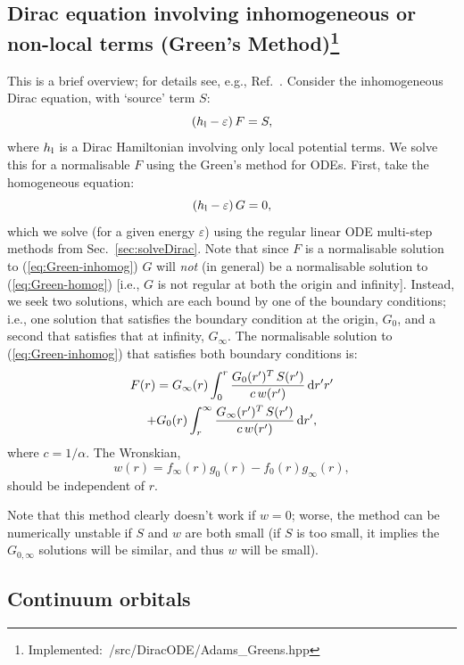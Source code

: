 \documentclass[10pt,twocolumn,a4paper]{article}%
\newcommand{\be}{\begin{equation}}
\newcommand{\ee}{\end{equation}}
\def\d{\ensuremath{{\rm d}}}
\def\en{\ensuremath{\varepsilon}}
\begin{document}
\subsection[Dirac equation involving inhomogeneous terms]{Dirac equation involving inhomogeneous or non-local terms (Green's Method)\footnote{Implemented:~/src/DiracODE/Adams\_Greens.hpp}}


This is a brief overview; for details see, e.g., Ref.~\cite{Arfken2013}.
Consider the inhomogeneous Dirac equation, with `source' term $S$:
\be\label{eq:Green-inhomog}
\left( h_{\rm l}- \en\right)F = S,
\ee
where $h_{\rm l}$ is a Dirac Hamiltonian involving only local potential terms.
We solve this for a normalisable $F$ using the Green's method for ODEs.
First, take the homogeneous equation:
\be\label{eq:Green-homog}
\left(h_{\rm l}- \en\right) G = 0,
\ee
which we solve (for a given energy $\en$) using the regular linear ODE multi-step methods from Sec.~\ref{sec:solveDirac}.
Note that since $F$ is a normalisable solution to (\ref{eq:Green-inhomog}) $G$ will {\em not} (in general) be a normalisable solution to (\ref{eq:Green-homog}) [i.e., $G$ is not regular at both the origin and infinity].
Instead, we seek two solutions, which are each bound by one of the boundary conditions; i.e., one solution that satisfies the boundary condition at the origin, $G_0$, and a second that satisfies that at infinity, $G_\infty$.
The normalisable solution to (\ref{eq:Green-inhomog}) that satisfies both boundary conditions is:
\begin{multline}\label{eq:GreensSolution}
F(r) = G_\infty(r) \int_0^r \frac{G_0(r')^T \, S(r')}{c\,w(r')}\,\d r'r'
\\
+  G_0(r) \int_r^\infty \frac{G_\infty(r')^T \, S(r')}{c\,w(r')}\,\d r',
\end{multline}
where $c=1/\alpha$. 
The Wronskian,
\be\label{eq:Green-Wronskian}
w(r) = f_\infty(r) g_0(r) - f_0(r)g_\infty(r),
\ee
should be independent of $r$.


Note that this method clearly doesn't work if $w=0$; worse, the method can be numerically unstable if $S$ and $w$ are both small (if $S$ is too small, it implies the $G_{0,\infty}$ solutions will be similar, and thus $w$ will be small).



\subsection{Continuum orbitals}
\end{document}

